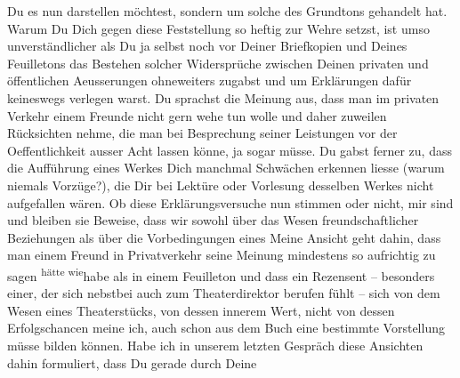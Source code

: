 \begin{ledgroupsized}[t]{13cm}
               Du es nun darstellen möchtest, sondern um solche des Grundtons gehandelt hat.\pend
           \pstart
           Warum Du Dich gegen diese Feststellung so heftig zur Wehre setzst, ist umso
               unverständlicher als Du ja selbst noch vor \label{T_L03521-1v}\label{T_L03521-1h} Deiner Briefkopien und Deines
                  Feuilletons das Bestehen
               solcher Widersprüche zwischen Deinen privaten und öffentlichen Aeusserungen
               ohneweiters zugabst und um Erklärungen dafür keineswegs verlegen warst. Du sprachst
               die Meinung aus, dass man im privaten Verkehr einem Freunde nicht gern wehe tun wolle
               und daher zuweilen Rücksichten nehme, die man bei Besprechung seiner Leistungen vor
               der Oeffentlichkeit ausser Acht lassen könne, ja sogar müsse. Du gabst ferner zu,
               dass die Aufführung eines Werkes Dich manchmal Schwächen erkennen liesse (warum
               niemals Vorzüge?), die Dir bei Lektüre oder Vorlesung desselben Werkes nicht
               aufgefallen wären. Ob diese Erklärungsversuche nun stimmen oder nicht, mir sind und
               bleiben sie Beweise, dass wir sowohl über das Wesen freundschaftlicher Beziehungen
               als über die Vorbedingungen eines \label{T_L03521-2v}\label{T_L03521-2h}{ }{\pb}Meine Ansicht geht dahin, dass man
               einem Freund in Privatverkehr seine Meinung mindestens so aufrichtig zu sagen \substVorne{}\textsuperscript{hätte wie}{\allowbreak}\substDazwischen{}habe als\substHinten{} in einem Feuilleton und dass ein Rezensent – besonders einer, der sich
               nebstbei auch zum Theaterdirektor berufen fühlt – sich von dem Wesen eines
               Theaterstücks, von dessen innerem Wert, nicht von dessen Erfolgschancen meine ich,
               auch schon aus dem Buch eine bestimmte Vorstellung müsse bilden können. Habe ich in
               unserem letzten Gespräch diese Ansichten dahin formuliert, dass Du gerade durch Deine

\end{ledgroupsized}
